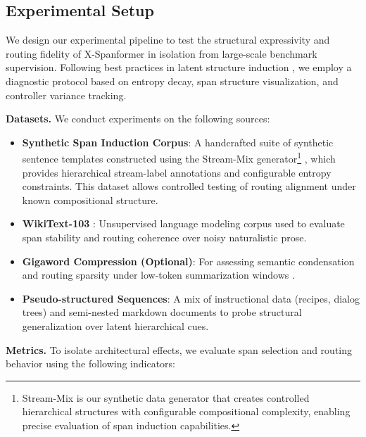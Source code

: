 \subsection{Experimental Setup}
\label{sec:experimental-setup}

We design our experimental pipeline to test the structural expressivity and routing fidelity of X-Spanformer in isolation from large-scale benchmark supervision. Following best practices in latent structure induction \cite{kim2019unsupervised, naradowsky2021structured, liu2019hierarchical}, we employ a diagnostic protocol based on entropy decay, span structure visualization, and controller variance tracking.

\vspace{0.5em}
\noindent\textbf{Datasets.} We conduct experiments on the following sources:

\begin{itemize}[leftmargin=1.5em]
  \item \textbf{Synthetic Span Induction Corpus}: A handcrafted suite of synthetic sentence templates constructed using the Stream-Mix generator\footnote{Stream-Mix is our synthetic data generator that creates controlled hierarchical structures with configurable compositional complexity, enabling precise evaluation of span induction capabilities.} \cite{rawson2025streammix}, which provides hierarchical stream-label annotations and configurable entropy constraints. This dataset allows controlled testing of routing alignment under known compositional structure.
  
  \item \textbf{WikiText-103} \cite{merity2016pointer}: Unsupervised language modeling corpus used to evaluate span stability and routing coherence over noisy naturalistic prose.

  \item \textbf{Gigaword Compression (Optional)}: For assessing semantic condensation and routing sparsity under low-token summarization windows \cite{rush2015neural}.

  \item \textbf{Pseudo-structured Sequences}: A mix of instructional data (recipes, dialog trees) and semi-nested markdown documents to probe structural generalization over latent hierarchical cues.
\end{itemize}

\vspace{0.5em}
\noindent\textbf{Metrics.} To isolate architectural effects, we evaluate span selection and routing behavior using the following indicators:

